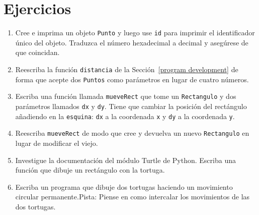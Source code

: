 \section{Ejercicios}

\begin{enumerate}
\item  Cree e imprima un objeto \texttt{Punto} y luego use
\texttt{id} para imprimir el identificador único del objeto. Traduzca 
el número hexadecimal a decimal y asegúrese de que coincidan.

\item  Reescriba la función \texttt{distancia} de la
Sección~\ref{program development} de forma que acepte dos \texttt{Puntos} como
parámetros en lugar de cuatro números.

\item Escriba una función llamada \texttt{mueveRect} que tome
un \texttt{Rectangulo} y dos parámetros llamados \texttt{dx} y \texttt{dy}. 
Tiene que cambiar la posición del rectángulo añadiendo en la  \texttt{esquina}: 
\texttt{dx} a la coordenada \texttt{x}  y  \texttt{dy} a la coordenada \texttt{y}.

\item Reescriba \texttt{mueveRect} de modo que cree y devuelva
un nuevo \texttt{Rectangulo} en lugar de modificar el viejo.

\item Investigue la documentación del módulo Turtle de Python. 
Escriba una función que dibuje un rectángulo con la tortuga.

\item Escriba un programa que dibuje dos tortugas haciendo un movimiento circular 
permanente.Pista: Piense en como intercalar los movimientos de las dos tortugas.


\end{enumerate}
